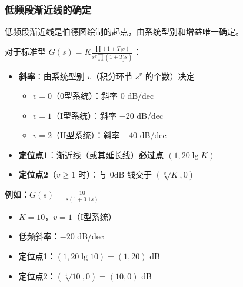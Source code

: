 \subsubsection{低频段渐近线的确定}

低频段渐近线是伯德图绘制的起点，由系统型别和增益唯一确定。

\begin{minipage}[t]{0.52\textwidth}
对于标准型 $G(s) = K \frac{\prod(1+T_i s)}{s^v\prod(1+T_j s)}$：
\begin{itemize}
    \item \textbf{斜率}：由系统型别 $v$（积分环节 $s^v$ 的个数）决定
    \begin{itemize}
        \item $v=0$（0型系统）：斜率 $0$ dB/dec
        \item $v=1$（I型系统）：斜率 $-20$ dB/dec
        \item $v=2$（II型系统）：斜率 $-40$ dB/dec
    \end{itemize}
    \item \textbf{定位点1}：渐近线（或其延长线）\textbf{必过点 $(1, 20\lg K)$}
    \item \textbf{定位点2}（$v \geq 1$ 时）：与 0dB 线交于 $(\sqrt[v]{K}, 0)$
\end{itemize}

\vspace{0.2cm}
\textbf{例如：}$G(s) = \frac{10}{s(1+0.1s)}$
\begin{itemize}
    \item $K=10$，$v=1$（I型系统）
    \item 低频斜率：$-20$ dB/dec
    \item 定位点1：$(1, 20\lg 10) = (1, 20)$ dB
    \item 定位点2：$(\sqrt[1]{10}, 0) = (10, 0)$ dB
\end{itemize}
\end{minipage}\hfill

